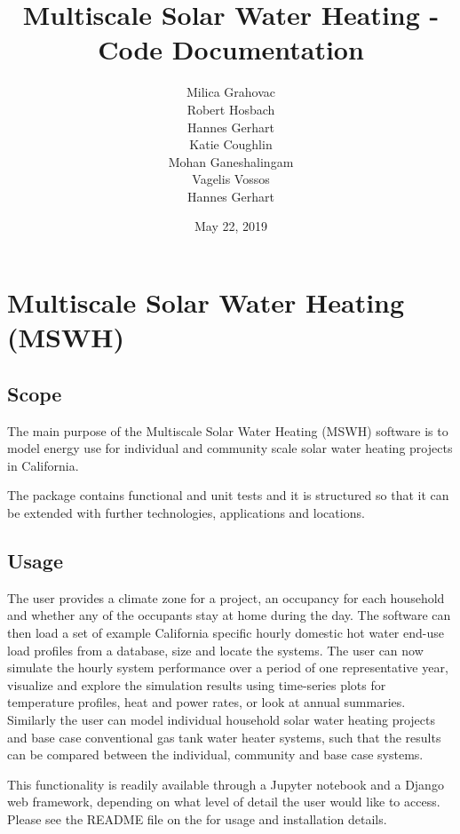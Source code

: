 \documentclass[letterpaper,10pt,english,openany]{sphinxmanual}
\title{Multiscale Solar Water Heating - Code Documentation}
\date{May 22, 2019}
\author{Milica Grahovac \\ Robert Hosbach \\ Hannes Gerhart \\ Katie Coughlin \\ Mohan Ganeshalingam \\ Vagelis Vossos \\ Hannes Gerhart}
\begin{document}
\pagestyle{empty}
\sphinxmaketitle
\pagestyle{plain}
\sphinxtableofcontents
\pagestyle{normal}
\label{\detokenize{index::doc}}



\chapter{Multiscale Solar Water Heating (MSWH)}
\label{\detokenize{source/models:multiscale-solar-water-heating-mswh}}\label{\detokenize{source/models:sec-sys-mod}}\label{\detokenize{source/models::doc}}

\section{Scope}
\label{\detokenize{source/models:scope}}
The main purpose of the Multiscale Solar Water Heating (MSWH) software is to model energy use for individual and community scale solar water heating projects in California.

The package contains functional and unit tests and it is structured so that it can be extended with further technologies, applications and locations.


\section{Usage}
\label{\detokenize{source/models:usage}}
The user provides a climate zone for a project, an occupancy for each household and whether any of the occupants stay at home during the day. The software can then load a set of example California specific hourly domestic hot water end-use load profiles from a database, size and locate the systems. The user can now simulate the hourly system performance over a period of one representative year, visualize and explore the simulation results using time-series plots for temperature profiles, heat and power rates, or look at annual summaries. Similarly the user can model individual household solar water heating projects and base case conventional gas tank water heater systems, such that the results can be compared between the individual, community and base case systems.

This functionality is readily available through a Jupyter notebook and a Django web framework, depending on what level of detail the user would like to access. Please see the README file on the  for usage and installation details.
\end{document}

